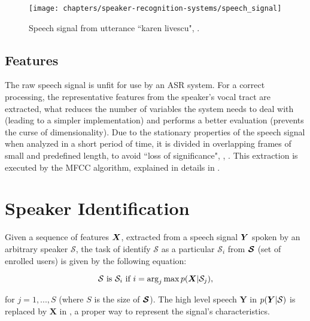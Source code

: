 \begin{figure}[ht]
    \centering
    \texttt{[image: chapters/speaker-recognition-systems/speech\_signal]}
    \caption{Speech signal from utterance ``karen livescu", .}
    \label{fig:speech_signal}
\end{figure}

\subsection{Features}

The raw speech signal is unfit for use by an ASR system. For a correct processing, the representative features from the speaker's vocal tract are extracted, what reduces the number of variables the system needs to deal with (leading to a simpler implementation) and performs a better evaluation (prevents the curse of dimensionality). Due to the stationary properties of the speech signal when analyzed in a short period of time, it is divided in overlapping frames of small and predefined length, to avoid ``loss of significance", , . This extraction is executed by the MFCC algorithm, explained in details in .

\section{Speaker Identification}
\label{sec:speaker-identification}

Given a sequence of features $\boldsymbol{X}$, extracted from a speech signal $\boldsymbol{Y}$ spoken by an arbitrary speaker $\mathcal{S}$, the task of identify $\mathcal{S}$ as a particular $\mathcal{S}_i$ from $\boldsymbol{\mathcal{S}}$ (set of enrolled users) is given by the following equation:

\begin{equation}
    \mathcal{S} \text{ is } \mathcal{S}_i \text{ if } i = \arg_j\max\postpdf{\boldsymbol{X}}{\mathcal{S}_j},
    \label{eq:classification_speaker_identification}
\end{equation}

\noindent for $j = 1, ..., S$ (where $S$ is the size of $\boldsymbol{\mathcal{S}}$). The high level speech $\boldsymbol{Y}$ in $p(\boldsymbol{Y}|\mathcal{S})$ is replaced by $\boldsymbol{X}$ in , a proper way to represent the signal's characteristics.

